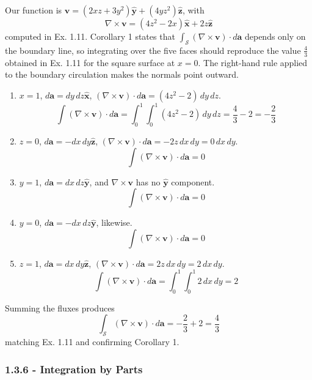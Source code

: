 \documentclass[a4paper]{article}
\begin{document}
Our function is \( \pmb{v} = \!\left( 2xz + 3y^{2} \right)\pmb{\hat{y}} + \!\left( 4yz^{2} \right)\pmb{\hat{z}} \), with 
\[
	\nabla \times \pmb{v} = \!\left( 4z^{2} - 2x \right)\pmb{\hat{x}} + 2z \pmb{\hat{z}} 
\]
computed in Ex. 1.11. Corollary 1 states that \( \int_{\mathcal{S}} \!\left( \nabla \times \pmb{v} \right) \cdot d \pmb{a} \) depends only on the boundary line, so integrating over the five faces should reproduce the value \( \frac{4}{3} \) obtained in Ex. 1.11 for the square surface at \( x = 0 \). The right-hand rule applied to the boundary circulation makes the normals point outward.
\begin{enumerate}[label=(\roman*)]
	\item \( x = 1 \), \( d \pmb{a} = dy \, dz \pmb{\hat{x}} \), \( \!\left( \nabla \times \pmb{v} \right) \cdot d \pmb{a} = \!\left( 4z^{2} - 2 \right) \, dy \, dz \).
	\[
		\int \!\left( \nabla \times \pmb{v} \right) \cdot d \pmb{a} = \int^{1}_{0} \int^{1}_{0} \!\left( 4z^{2} - 2 \right) \, dy \, dz = \frac{4}{3} - 2 = -\frac{2}{3}
	\]
	\item \( z = 0 \), \( d \pmb{a} = -dx \, dy \pmb{\hat{z}} \), \( \!\left( \nabla \times \pmb{v} \right) \cdot d \pmb{a} = -2z \, dx \, dy = 0 \, dx \, dy \).
	\[
		\int \!\left( \nabla \times \pmb{v} \right) \cdot d \pmb{a} = 0
	\]
	\item \( y = 1 \), \( d \pmb{a} = dx \, dz \pmb{\hat{y}} \), and \( \nabla \times \pmb{v} \) has no \( \pmb{\hat{y}} \) component.
	\[
		\int \!\left( \nabla \times \pmb{v} \right) \cdot d \pmb{a} = 0
	\]
	\item \( y = 0 \), \( d \pmb{a} = -dx \, dz \pmb{\hat{y}} \), likewise.
	\[
		\int \!\left( \nabla \times \pmb{v} \right) \cdot d \pmb{a} = 0
	\]
	\item \( z = 1 \), \( d \pmb{a} = dx \, dy \pmb{\hat{z}} \), \( \!\left( \nabla \times \pmb{v} \right) \cdot d \pmb{a} = 2z \, dx \, dy = 2 \, dx \, dy \).
	\[
		\int \!\left( \nabla \times \pmb{v} \right) \cdot d \pmb{a} = \int^{1}_{0} \int^{1}_{0} 2 \, dx \, dy = 2
	\]
\end{enumerate}
Summing the fluxes produces
\[
	\int_{\mathcal{S}} \!\left( \nabla \times \pmb{v} \right) \cdot d \pmb{a} = -\frac{2}{3} + 2 = \frac{4}{3}
\]
matching Ex. 1.11 and confirming Corollary 1.

\newpage
\subsubsection{\textsf{1.3.6 - Integration by Parts}}
\end{document}

